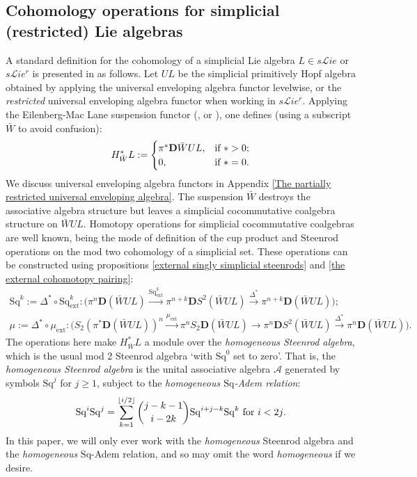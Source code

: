 \documentclass[11pt]{amsart} \renewcommand{\baselinestretch}{1.2}
\theoremstyle{plain}
\theoremstyle{definition}
\renewcommand{\to}{\longrightarrow}
\newcommand{\scrL}{\mathscr{L}}
\newcommand{\calA}{\mathcal{A}}
\newcommand{\citeBOX}[2][]{\cite[\mbox{#1}]{#2}}
\newcommand{\ExtCohOp}{\mathrm{Sq}_\mathrm{ext}}
\newcommand{\ExtCohProd}{\mu_\mathrm{ext}}
\newcommand{\Sq}{\mathrm{Sq}}
\newcommand{\LieSteen}{\calA}
\newcommand{\liealgs}{{\scrL\!\textit{ie}}}
\newcommand{\restliealgs}{{\scrL\!\textit{ie}^\textit{r}}}
\newcommand{\dual}{\mathbf{D}}
\begin{document}
\begin{Constructing cohomology operations}
\subsection{Cohomology operations for simplicial (restricted) Lie algebras}
\label{section: Cohomology operations for simplicial (restricted) Lie algebras}
A standard definition for the cohomology of a simplicial Lie algebra $L\in s\liealgs$ or $s\restliealgs$ is presented in \cite{PriddySimplicialLie.pdf} as follows. Let $UL$ be the simplicial primitively Hopf algebra obtained by applying the universal enveloping algebra functor levelwise, or the \emph{restricted} universal enveloping algebra functor when working in $s\restliealgs$. %
Applying the Eilenberg-Mac Lane suspension functor (\citeBOX[\S2.3]{PriddySimplicialLie.pdf}, \citeBOX[\S5]{MillerSullivanConjecture.pdf} or \citeBOX[p.~87]{MaySimpObj.pdf}), one defines (using a subscript $\bar{W}$ to avoid confusion):
\[H_{\bar{W}}^*L:=\begin{cases}
\pi^*\dual\bar{W}UL,&\textup{if }*>0;\\
0,&\textup{if }*=0.
\end{cases}\]
We discuss universal enveloping algebra functors in Appendix \ref{The partially restricted universal enveloping algebra}.
The suspension $\bar{W}$ destroys the associative algebra structure but leaves a simplicial cocommutative coalgebra structure on $\bar{W}UL$. Homotopy operations for simplicial cocommutative coalgebras are well known, being the mode of definition of the cup product and Steenrod operations on the mod two cohomology of a simplicial set. These operations can be constructed using  propositions \ref{external singly simplicial steenrods} and \ref{the external cohomotopy pairing}:
\begin{gather*}
\Sq^k:=\Delta^*\circ\ExtCohOp^k:\bigl(\pi^n\dual (\bar{W}UL)\overset{\ExtCohOp^k}{\to}\pi^{n+k}\dual S^2(\bar{W}UL)\overset{\Delta^*}{\to}\pi^{n+k}\dual (\bar{W}UL)\bigr);\\
\mu:=\Delta^*\circ\ExtCohProd:\bigl(S_2(\pi^*\dual(\bar{W}UL))^{n}\overset{\ExtCohProd}{\to} \pi^nS_2\dual(\bar{W}UL)\to \pi^n\dual S^2(\bar{W}UL)\overset{\Delta^*}{\to}\pi^n\dual (\bar{W}UL)\bigr).
\end{gather*}
The operations here make $H^*_{\bar{W}}L$ a module over the \emph{homogeneous Steenrod algebra}, which is the usual mod 2 Steenrod algebra `with $\Sq^0$ set to zero'. That is, the \emph{homogeneous Steenrod algebra} is the unital associative algebra $\LieSteen$ generated by symbols $\Sq^j$ for $j\geq1$, subject to the \emph{homogeneous $\Sq$-Adem relation}:
\[\Sq^i\Sq^j=\sum_{k=1}^{\lfloor i/2\rfloor}{j-k-1\choose i-2k}\Sq^{i+j-k}\Sq^k\textup{\ for $i<2j$.}\]
In this paper, we will only ever work with the \emph{homogeneous} Steenrod algebra and the \emph{homogeneous} $\Sq$-Adem relation, and so may omit the word \emph{homogeneous} if we desire.


\end{Constructing cohomology operations}
\end{document}
